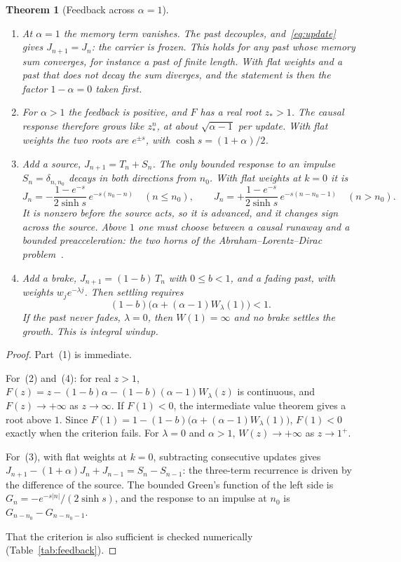 \documentclass[11pt]{amsart}
\newtheorem{theorem}{Theorem}[section]
\theoremstyle{definition}
\theoremstyle{remark}
\begin{document}
\begin{theorem}[Feedback across $\alpha=1$]\label{thm:feedback}
\begin{enumerate}
\item At $\alpha=1$ the memory term vanishes. The past decouples, and~\eqref{eq:update} gives $J_{n+1}=J_n$: the carrier is frozen. This holds for any past whose memory sum converges, for instance a past of finite length. With flat weights and a past that does not decay the sum diverges, and the statement is then the factor $1-\alpha=0$ taken first.
\item For $\alpha>1$ the feedback is positive, and $F$ has a real root $z_*>1$. The causal response therefore grows like $z_*^n$, at about $\sqrt{\alpha-1}$ per update. With flat weights the two roots are $e^{\pm s}$, with $\cosh s=(1+\alpha)/2$.
\item Add a source, $J_{n+1}=T_n+S_n$. The only bounded response to an impulse $S_n=\delta_{n,n_0}$ decays in both directions from $n_0$. With flat weights at $k=0$ it is
\[
J_n=-\frac{1-e^{-s}}{2\sinh s}\,e^{-s(n_0-n)}\quad(n\le n_0),\qquad J_n=+\frac{1-e^{-s}}{2\sinh s}\,e^{-s(n-n_0-1)}\quad(n>n_0).
\]
It is nonzero before the source acts, so it is advanced, and it changes sign across the source. Above $1$ one must choose between a causal runaway and a bounded preacceleration: the two horns of the Abraham--Lorentz--Dirac problem~\cite{Dirac}.
\item Add a brake, $J_{n+1}=(1-b)\,T_n$ with $0\le b<1$, and a fading past, with weights $w_je^{-\lambda j}$. Then settling requires
\[
(1-b)\big(\alpha+(\alpha-1)W_\lambda(1)\big)<1 .
\]
If the past never fades, $\lambda=0$, then $W(1)=\infty$ and no brake settles the growth. This is integral windup.
\end{enumerate}
\end{theorem}

\begin{proof}
Part~(1) is immediate.

For~(2) and~(4): for real $z>1$, $F(z)=z-(1-b)\alpha-(1-b)(\alpha-1)W_\lambda(z)$ is continuous, and $F(z)\to+\infty$ as $z\to\infty$. If $F(1)<0$, the intermediate value theorem gives a root above $1$. Since $F(1)=1-(1-b)\big(\alpha+(\alpha-1)W_\lambda(1)\big)$, $F(1)<0$ exactly when the criterion fails. For $\lambda=0$ and $\alpha>1$, $W(z)\to+\infty$ as $z\to1^+$.

For~(3), with flat weights at $k=0$, subtracting consecutive updates gives $J_{n+1}-(1+\alpha)J_n+J_{n-1}=S_n-S_{n-1}$: the three-term recurrence is driven by the difference of the source. The bounded Green's function of the left side is $G_n=-e^{-s\lvert n\rvert}/(2\sinh s)$, and the response to an impulse at $n_0$ is $G_{n-n_0}-G_{n-n_0-1}$.

That the criterion is also sufficient is checked numerically (Table~\ref{tab:feedback}). \end{proof}
\end{document}
